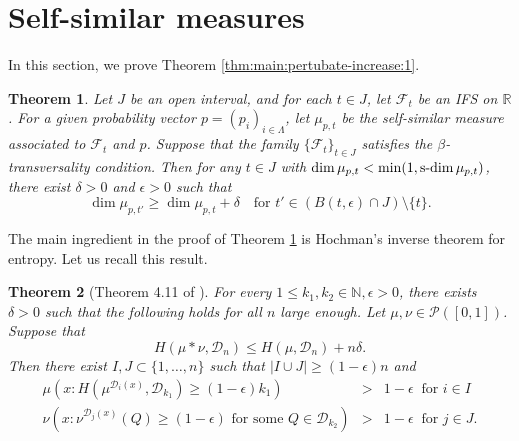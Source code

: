 \documentclass[a4paper,11pt]{amsart}
\newtheorem{theorem}{Theorem}[section]
\theoremstyle{definition}
\numberwithin{equation}{section}
\def\D{\mathcal{D}}
\def\cP{\mathcal P}
\def\F{\mathcal F}
\def\N{\mathbb N}
\def\R{\mathbb R}
\DeclareMathOperator{\sd}{{\rm{s}\textrm{-}\rm{dim}}}
\begin{document}
\fi




\section{Self-similar measures}\label{section:easy-proof-proj-self-similar-without-rotation}
In this section, we prove  Theorem  \ref{thm:main:pertubate-increase:1}.  
\begin{theorem}\label{thm:main:pertubate-increase:2}
Let $J$ be an open  interval, and for each $t\in J$, let $\F_t$ be an IFS on $\R$. For a given probability vector $p=(p_i)_{i\in \Lambda}$, let $\mu_{p,t}$ be the self-similar measure associated to $\F_t$ and $p$.  Suppose that the family $\{\F_t\}_{t\in J}$ satisfies the $\beta$-transversality condition.  Then for any $t\in J$ with $\dim \mu_{p,t}<\min (1,\sd \mu_{p,t})$,  there exist $\delta>0$ and $\epsilon>0$ such that 
\[
 \dim \mu_{p,t'} \ge \dim \mu_{p,t}+\delta  \  \  \  \textrm{ for } t'\in \left(B(t,\epsilon)\cap J\right)\setminus \{t\}. 
\]
\end{theorem}

The main ingredient in the proof of Theorem \ref{thm:main:pertubate-increase:2} is Hochman's inverse theorem for entropy. Let us recall this result. 
\begin{theorem}[Theorem 4.11 of \cite{Hochman2014}]\label{theorem:Hochman-inverse-thm}
For  every $1\le k_1,k_2 \in \N, \epsilon>0$,   there exists $\delta>0$ such that the following holds for all $n$ large enough. Let $\mu,\nu\in \cP([0,1])$. Suppose that 
\[H(\mu*\nu,\D_{n})\le H(\mu,\D_{n})+n\delta.\]
Then there exist $I,J\subset \{1,\ldots,n\}$ such that $|I\cup J|\ge (1-\epsilon)n$ and 
\begin{eqnarray*}
\mu\left(x: H(\mu^{\D_{i}(x)},\D_{k_1})\ge (1-\epsilon)k_1 \right) & > & 1-\epsilon \  \textrm{ for } i\in I  \\
\nu\left(x: \nu^{\D_{j}(x)}(Q)\ge (1-\epsilon) \textrm{ for some } Q\in \D_{k_2} \right) & > & 1-\epsilon \  \textrm{ for } j\in J. 
\end{eqnarray*}
\end{theorem}
\end{document}
